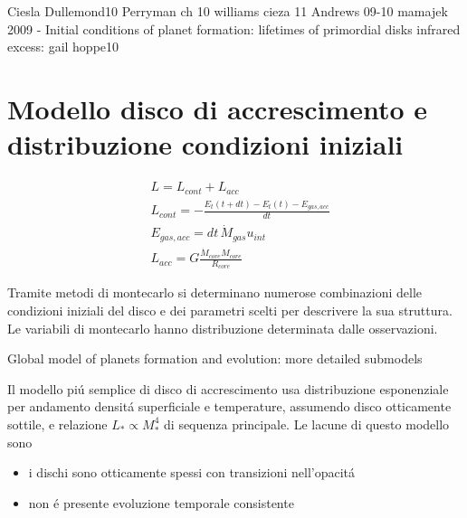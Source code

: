 \begin{workout}
	Ciesla Dullemond10 
	Perryman ch 10
	williams cieza 11
	Andrews 09-10
	mamajek 2009 - Initial conditions of planet formation: lifetimes of primordial disks
	infrared excess: gail hoppe10
\end{workout}

\section{Modello disco di accrescimento e distribuzione condizioni iniziali}

\begin{workout}
	\begin{align}
		&L=L_{cont}+L_{acc}\\
		&L_{cont}=-\frac{E_t(t+dt)-E_t(t)-E_{gas,acc}}{dt}\\
		&E_{gas,acc}=dt\,\dot{M}_{gas}u_{int}\\
		&L_{acc}=G\frac{\dot{M}_{core}M_{core}}{R_{core}}
	\end{align}
\end{workout}

Tramite metodi di montecarlo si determinano numerose combinazioni delle condizioni iniziali del disco e dei parametri scelti per descrivere la sua struttura.
Le variabili di montecarlo hanno distribuzione determinata dalle osservazioni.

\begin{workout}
	Global model of planets formation and evolution: more detailed submodels
\end{workout}

Il modello pi\'u semplice di disco di accrescimento usa distribuzione esponenziale per andamento densit\'a superficiale e temperature, assumendo disco otticamente sottile, e relazione $L_*\propto M_*^4$ di sequenza principale. Le lacune di questo modello sono
\begin{itemize}
	\item i dischi sono otticamente spessi con transizioni nell'opacit\'a
	\item non \'e presente evoluzione temporale consistente
\end{itemize}

